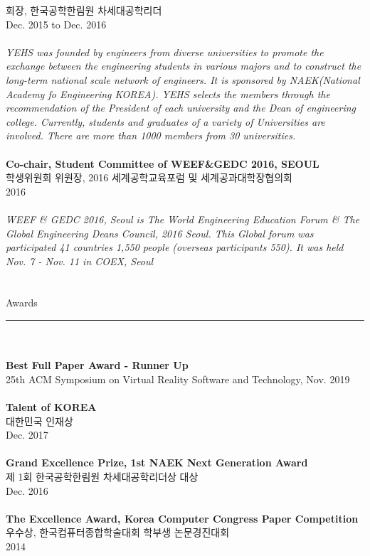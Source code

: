 \documentclass[letterpaper,11pt,oneside]{article}
\begin{document}
회장, 한국공학한림원 차세대공학리더 \\
Dec. 2015 to Dec. 2016 \\
\\
\emph{YEHS was founded by engineers from diverse universities to promote the exchange between the engineering students in various majors and to construct the long-term national scale network of engineers. It is sponsored by NAEK(National Academy fo Engineering KOREA). YEHS selects the members through the recommendation of the President of each university and the Dean of engineering college. Currently, students and graduates of a variety of Universities are involved. There are more than 1000 members from 30 universities.} \\
\\
\textbf{Co-chair, Student Committee of WEEF\&GEDC 2016, SEOUL}\\
학생위원회 위원장, 2016 세계공학교육포럼 및 세계공과대학장협의회 \\
2016 \\
\\
\emph{WEEF \& GEDC 2016, Seoul is The World Engineering Education Forum \& The Global Engineering Deans Council, 2016 Seoul. This Global forum was participated 41 countries 1,550 people (overseas participants 550). It was held Nov. 7 - Nov. 11 in COEX, Seoul}\\
\\
\\
 \Large{Awards}   \\
 \noindent\rule{8cm}{0.4pt}\\
 \\
\normalsize \textbf{Best Full Paper Award - Runner Up} \\
25th ACM Symposium on Virtual Reality Software and Technology, Nov. 2019 \\
\\
\textbf{Talent of KOREA} \\
대한민국 인재상 \\
Dec. 2017 \\
\\
\textbf{Grand Excellence Prize, 1st NAEK Next Generation Award}\\
제 1회 한국공학한림원 차세대공학리더상 대상 \\
Dec. 2016 \\
\\
\textbf{The Excellence Award, Korea Computer Congress Paper Competition}\\
우수상, 한국컴퓨터종합학술대회 학부생 논문경진대회 \\
2014 \\
\\
\\

\clearpage
\setlength\parindent{0cm}
\end{document}
